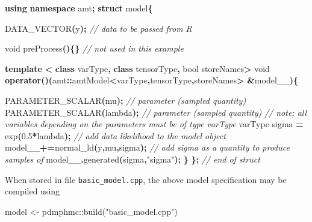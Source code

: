 \documentclass[
]{book}
\newenvironment{Shaded}{\begin{snugshade}}{\end{snugshade}}
\newcommand{\CommentTok}[1]{\textcolor[rgb]{0.56,0.35,0.01}{\textit{#1}}}
\newcommand{\DataTypeTok}[1]{\textcolor[rgb]{0.13,0.29,0.53}{#1}}
\newcommand{\FloatTok}[1]{\textcolor[rgb]{0.00,0.00,0.81}{#1}}
\newcommand{\FunctionTok}[1]{\textcolor[rgb]{0.00,0.00,0.00}{#1}}
\newcommand{\KeywordTok}[1]{\textcolor[rgb]{0.13,0.29,0.53}{\textbf{#1}}}
\newcommand{\NormalTok}[1]{#1}
\newcommand{\OperatorTok}[1]{\textcolor[rgb]{0.81,0.36,0.00}{\textbf{#1}}}
\newcommand{\OtherTok}[1]{\textcolor[rgb]{0.56,0.35,0.01}{#1}}
\newcommand{\SpecialCharTok}[1]{\textcolor[rgb]{0.00,0.00,0.00}{#1}}
\newcommand{\StringTok}[1]{\textcolor[rgb]{0.31,0.60,0.02}{#1}}
\begin{document}
\begin{Shaded}
\begin{Highlighting}[]
\KeywordTok{using} \KeywordTok{namespace}\NormalTok{ amt}\OperatorTok{;}
\KeywordTok{struct}\NormalTok{ model}\OperatorTok{\{}
  
\NormalTok{  DATA\_VECTOR}\OperatorTok{(}\NormalTok{y}\OperatorTok{);} \CommentTok{// data to be passed from R}
  
  \DataTypeTok{void}\NormalTok{ preProcess}\OperatorTok{()\{\}} \CommentTok{// not used in this example }

  \KeywordTok{template} \OperatorTok{\textless{}} \KeywordTok{class}\NormalTok{ varType}\OperatorTok{,} \KeywordTok{class}\NormalTok{ tensorType}\OperatorTok{,} \DataTypeTok{bool}\NormalTok{ storeNames}\OperatorTok{\textgreater{}}
  \DataTypeTok{void} \KeywordTok{operator}\OperatorTok{()(}\NormalTok{amt}\OperatorTok{::}\NormalTok{amtModel}\OperatorTok{\textless{}}\NormalTok{varType}\OperatorTok{,}\NormalTok{tensorType}\OperatorTok{,}\NormalTok{storeNames}\OperatorTok{\textgreater{}} \OperatorTok{\&}\NormalTok{model\_\_}\OperatorTok{)\{}
    
\NormalTok{    PARAMETER\_SCALAR}\OperatorTok{(}\NormalTok{mu}\OperatorTok{);} \CommentTok{// parameter (sampled quantity)}
\NormalTok{    PARAMETER\_SCALAR}\OperatorTok{(}\NormalTok{lambda}\OperatorTok{);} \CommentTok{// parameter (sampled quantity)}
    \CommentTok{// note; all variables depending on the parameters must be of type varType}
\NormalTok{    varType sigma }\OperatorTok{=}\NormalTok{ exp}\OperatorTok{(}\FloatTok{0.5}\OperatorTok{*}\NormalTok{lambda}\OperatorTok{);}
    \CommentTok{// add data likelihood to the model object}
\NormalTok{    model\_\_}\OperatorTok{+=}\NormalTok{normal\_ld}\OperatorTok{(}\NormalTok{y}\OperatorTok{,}\NormalTok{mu}\OperatorTok{,}\NormalTok{sigma}\OperatorTok{);}
    \CommentTok{// add sigma as a quantity to produce samples of}
\NormalTok{    model\_\_}\OperatorTok{.}\NormalTok{generated}\OperatorTok{(}\NormalTok{sigma}\OperatorTok{,}\StringTok{"sigma"}\OperatorTok{);}
  \OperatorTok{\}} 
\OperatorTok{\};} \CommentTok{// end of struct}
\end{Highlighting}
\end{Shaded}

When stored in file \texttt{basic\_model.cpp}, the above model specification may be compiled using

\begin{Shaded}
\begin{Highlighting}[]
\NormalTok{model }\OtherTok{\textless{}{-}}\NormalTok{ pdmphmc}\SpecialCharTok{::}\FunctionTok{build}\NormalTok{(}\StringTok{"basic\_model.cpp"}\NormalTok{)}
\end{Highlighting}
\end{Shaded}
\end{document}
